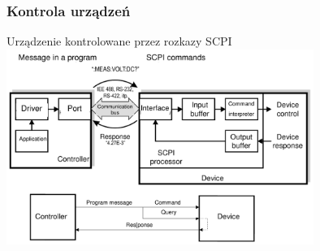 \subsubsection{Kontrola urządzeń}
Urządzenie kontrolowane przez rozkazy SCPI\\
\includegraphics[width=10cm]{./wyklady/IEEE488_SCPI_16_1.pdf}



